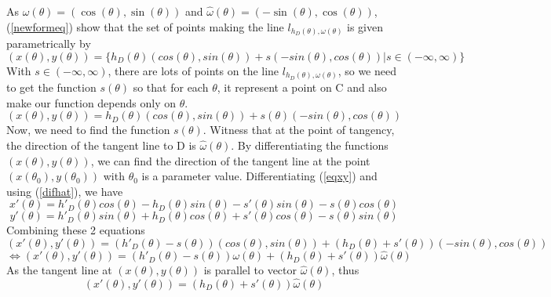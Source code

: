 \documentclass[a4paper]{article}
\begin{document}
\noindent As $\omega(\theta) = (\cos(\theta),\sin(\theta))$ and $\hat{\omega}(\theta) = (-\sin(\theta),\cos(\theta))$, (\ref{newformeq}) show that the set of points making the line $l_{h_D(\theta),\omega(\theta)}$ is given parametrically by
\begin{equation*}
    (x(\theta),y(\theta)) = \{h_D(\theta)(cos(\theta),sin(\theta)) + s(-sin(\theta),cos(\theta)) | s \in (-\infty,\infty)\}
\end{equation*}
With $s \in (-\infty,\infty)$, there are lots of points on the line $l_{h_D(\theta),\omega(\theta)}$, so we need to get the function $s(\theta)$ so that for each $\theta$, it represent a point on C and also make our function depends only on $\theta$.
\begin{equation}\label{eqxy}
    (x(\theta),y(\theta)) = h_D(\theta)(cos(\theta),sin(\theta)) + s(\theta)(-sin(\theta),cos(\theta))
\end{equation}
Now, we need to find the function $s(\theta)$. Witness that at the point of tangency, the direction of the tangent line to D is $\hat{\omega}(\theta)$. By differentiating the functions $(x(\theta),y(\theta))$, we can find the direction of the tangent line at the point $(x(\theta_0),y(\theta_0))$ with $\theta_0$ is a parameter value. Differentiating (\ref{eqxy}) and using (\ref{difhat}), we have
\begin{equation*}
    x'(\theta) = h'_D(\theta)cos(\theta) - h_D(\theta)sin(\theta) - s'(\theta)sin(\theta) - s(\theta)cos(\theta)
\end{equation*}
\begin{equation*}
    y'(\theta) = h'_D(\theta)sin(\theta) + h_D(\theta)cos(\theta) + s'(\theta)cos(\theta) - s(\theta)sin(\theta)
\end{equation*}
Combining these 2 equations
\begin{equation*}
    (x'(\theta),y'(\theta)) = (h'_D(\theta) - s(\theta))(cos(\theta),sin(\theta)) + (h_D(\theta) + s'(\theta))(-sin(\theta),cos(\theta))
\end{equation*}
\begin{equation}
    \Leftrightarrow(x'(\theta),y'(\theta)) = (h'_D(\theta) - s(\theta))\omega(\theta) + (h_D(\theta) + s'(\theta))\hat{\omega}(\theta)
\end{equation}
As the tangent line at $(x(\theta),y(\theta))$ is parallel to vector $\hat{\omega}(\theta)$, thus
\begin{equation}\label{eqpara}
    (x'(\theta),y'(\theta)) = (h_D(\theta) + s'(\theta))\hat{\omega}(\theta)
\end{equation}
\end{document}
